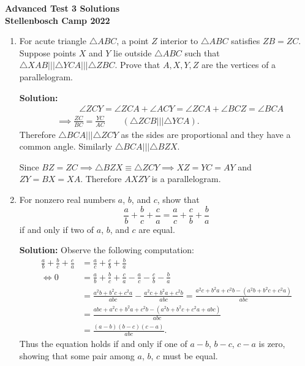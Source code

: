 \documentclass[12pt]{article}
\begin{document}
\thispagestyle{empty}

\begin{center} \bfseries
  \Large Advanced Test 3 Solutions
  \\ \vspace{12pt}
  \large Stellenbosch Camp 2022
\end{center}

\bigskip \bigskip

\begin{enumerate}[itemsep=24pt]

\item 
For acute triangle $\triangle ABC$, a point $Z$ interior to $\triangle ABC$ satisfies $ZB = ZC$.
Suppose points $X$ and $Y$ lie outside $\triangle ABC$ such that $\triangle XAB \mathrel{|||} \triangle YCA \mathrel{|||} \triangle ZBC$.
Prove that $A,X,Y,Z$ are the vertices of a parallelogram. 

\textbf{Solution:}
\begin{align*}
  &\mspace{48mu} \angle ZCY = \angle ZCA + \angle ACY = \angle ZCA + \angle BCZ = \angle BCA \\
  &\implies \frac{ZC}{BC} = \frac{YC}{AC} \qquad (\triangle ZCB \mathrel{|||} \triangle YCA).
\end{align*}
Therefore $\triangle BCA \mathrel{|||} \triangle ZCY$ as the sides are proportional and they have a common angle. Similarly $\triangle BCA \mathrel{|||} \triangle BZX$. 

Since $BZ = ZC \implies \triangle BZX \equiv \triangle ZCY \implies XZ = YC = AY$ and $ZY = BX = XA$.
Therefore $AXZY$ is a parallelogram.


\item %
For nonzero real numbers $a$, $b$, and $c$, show that
\[ \frac{a}{b} +\frac{b}{c} +\frac{c}{a} = \frac{a}{c} +\frac{c}{b} +\frac{b}{a} \]
if and only if two of $a$, $b$, and $c$ are equal.

\textbf{Solution:} Observe the following computation:
\begin{align*}
  \frac{a}{b} +\frac{b}{c} +\frac{c}{a} &= \frac{a}{c} +\frac{c}{b} +\frac{b}{a} \\
  \iff 0 &= \frac{a}{b} +\frac{b}{c} +\frac{c}{a} -\frac{a}{c} -\frac{c}{b} -\frac{b}{a} \\
  &= \frac{a^{2}b + b^{2}c + c^{2}a}{abc} -\frac{a^{2}c + b^{2}a + c^{2}b}{abc} = \frac{a^{2}c + b^{2}a + c^{2}b -(a^{2}b + b^{2}c + c^{2}a)}{abc} \\
  &= \frac{abc + a^{2}c + b^{2}a + c^{2}b - (a^{2}b + b^{2}c + c^{2}a+abc)}{abc} \\
  &= \frac{(a-b)(b-c)(c-a)}{abc}.
\end{align*}
Thus the equation holds if and only if one of $a-b$, $b-c$, $c-a$ is zero, showing that some pair among $a$, $b$, $c$ must be equal.



\end{enumerate}
\end{document}
